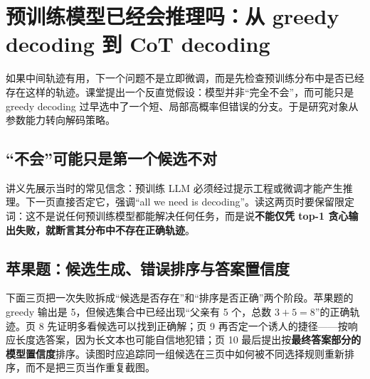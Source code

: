 \section{预训练模型已经会推理吗：从 greedy decoding 到 CoT decoding}

如果中间轨迹有用，下一个问题不是立即微调，而是先检查预训练分布中是否已经存在这样的轨迹。课堂提出一个反直觉假设：模型并非“完全不会”，而可能只是 greedy decoding 过早选中了一个短、局部高概率但错误的分支。于是研究对象从参数能力转向解码策略。

\subsection{“不会”可能只是第一个候选不对}

讲义先展示当时的常见信念：预训练 LLM 必须经过提示工程或微调才能产生推理。下一页直接否定它，强调“all we need is decoding”。读这两页时要保留限定词：这不是说任何预训练模型都能解决任何任务，而是说\textbf{不能仅凭 top-1 贪心输出失败，就断言其分布中不存在正确轨迹}。




\subsection{苹果题：候选生成、错误排序与答案置信度}

下面三页把一次失败拆成“候选是否存在”和“排序是否正确”两个阶段。苹果题的 greedy 输出是 5，但候选集合中已经出现“父亲有 5 个，总数 $3+5=8$”的正确轨迹。页 8 先证明多看候选可以找到正确解；页 9 再否定一个诱人的捷径——按响应长度选答案，因为长文本也可能自信地犯错；页 10 最后提出按\textbf{最终答案部分的模型置信度}排序。读图时应追踪同一组候选在三页中如何被不同选择规则重新排序，而不是把三页当作重复截图。




